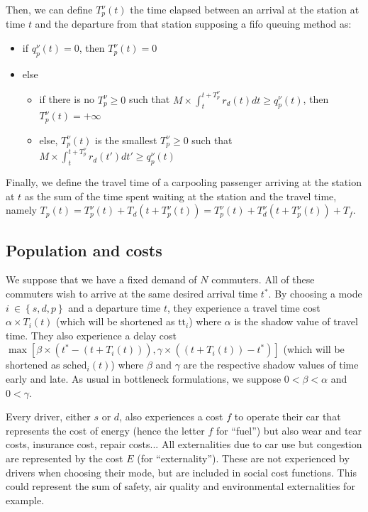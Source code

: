 \documentclass[english, a4paper]{article}
\theoremstyle{plain}
\theoremstyle{definition}
\theoremstyle{remark}
\begin{document}
Then, we can define $T^{\nu}_p(t)$ the time elapsed between an arrival at the station at time $t$ and the departure from that station supposing a \acrfull{fifo} queuing method as:

\begin{itemize}
    \item if $q_p^{\nu}(t) = 0$, then $T^{\nu}_p(t) = 0$
    \item else
    \begin{itemize}
        \item if there is no $T^{\nu}_p \geq 0$ such that $M \times \int_{t}^{t+T^{\nu}_p} r_d(t) dt \geq q_p^{\nu}(t)$, then $T^{\nu}_p(t) = +\infty$
        \item else, $T^{\nu}_p(t)$ is the smallest $T^{\nu}_p \geq 0$ such that $M \times \int_{t}^{t + T^{\nu}_p} r_d(t') dt' \geq q_p^{\nu}(t)$
    \end{itemize}
\end{itemize}

Finally, we define the travel time of a carpooling passenger arriving at the station at $t$ as the sum of the time spent waiting at the station and the travel time, namely $T_p(t) = T^{\nu}_p(t) + T_d(t + T^{\nu}_p(t)) = T^{\nu}_p(t) + T^{\nu}_d(t + T^{\nu}_p(t)) + T_f$.


\subsection{Population and costs}

We suppose that we have a fixed demand of $N$ commuters. All of these commuters wish to arrive at the same desired arrival time $t^*$. By choosing a mode $i\ \in \left\{ s, d, p \right\}$ and a departure time $t$, they experience a travel time cost $\alpha \times T_i(t)$ (which will be shortened as $\text{tt}_i$) where $\alpha$ is the shadow value of travel time. They also experience a delay cost $\max [\beta \times (t^* - (t + T_i(t))), \gamma \times ((t + T_i(t)) - t^*)]$ (which will be shortened as $\text{sched}_i(t)$) where $\beta$ and $\gamma$ are the respective shadow values of time early and late. As usual in bottleneck formulations, we suppose $0 < \beta < \alpha$ and $0 < \gamma$. 

Every driver, either $s$ or $d$, also experiences a cost $f$ to operate their car that represents the cost of energy (hence the letter $f$ for ``fuel'') but also wear and tear costs, insurance cost, repair costs... All externalities due to car use but congestion are represented by the cost $E$ (for ``externality''). These are not experienced by drivers when choosing their mode, but are included in social cost functions. This could represent the sum of safety, air quality and environmental externalities for example.
\end{document}
